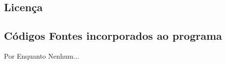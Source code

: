 \documentclass[a4paper,12pt]{article}
\begin{document}
		\subsection{Licença} 
		
		\subsection{Códigos Fontes incorporados ao programa}
		
		Por Enquanto Nenhum...
		
\end{document}
